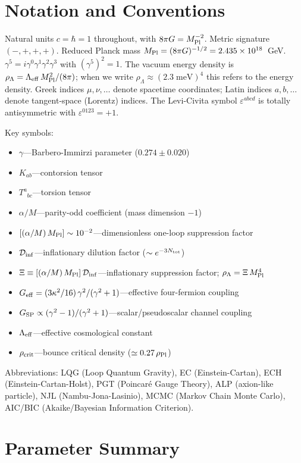 \documentclass[aps,prd,twocolumn,superscriptaddress,showpacs,preprintnumbers,
  nofootinbib,longbibliography,floatfix]{revtex4-2}
\newcommand{\Leff}{\Lambda_{\rm eff}}
\newcommand{\Dinf}{\mathcal{D}_{\rm inf}}
\newcommand{\rhocrit}{\rho_{\rm crit}}
\newcommand{\rhoPl}{\rho_{\rm Pl}}
\newcommand{\MPl}{M_{\rm Pl}}
\newcommand{\BI}{\gamma}
\newcommand{\Geff}{G_{\rm eff}}
\newcommand{\Gsp}{G_{\rm SP}}
\begin{document}
\section{Notation and Conventions}\label{app:notation}

Natural units $c=\hbar=1$ throughout, with $8\pi G = \MPl^{-2}$.
Metric signature $(-,+,+,+)$. Reduced Planck mass
$\MPl = (8\pi G)^{-1/2} = 2.435 \times 10^{18}$~GeV.
$\gamma^5 = i\gamma^0\gamma^1\gamma^2\gamma^3$ with
$(\gamma^5)^2 = 1$. The vacuum energy density is
$\rho_\Lambda = \Leff\,\MPl^2/(8\pi)$; when we write
$\rho_\Lambda \approx (2.3\;\text{meV})^4$ this refers to the energy
density. Greek indices $\mu,\nu,\ldots$ denote spacetime coordinates;
Latin indices $a,b,\ldots$ denote tangent-space (Lorentz) indices.
The Levi-Civita symbol $\varepsilon^{abcd}$ is totally antisymmetric
with $\varepsilon^{0123}=+1$.

Key symbols:
\begin{itemize}[leftmargin=*]
\item $\BI$---Barbero-Immirzi parameter ($0.274 \pm 0.020$)
\item $K_{ab}$---contorsion tensor
\item $T^a_{\;\;bc}$---torsion tensor
\item $\alpha/M$---parity-odd coefficient (mass dimension $-1$)
\item $[(\alpha/M)\,\MPl]\sim 10^{-2}$---dimensionless one-loop
  suppression factor
\item $\Dinf$---inflationary dilution factor ($\sim e^{-3N_{\rm tot}}$)
\item $\Xi\equiv[(\alpha/M)\,\MPl]\,\Dinf$---inflationary suppression
  factor; $\rho_\Lambda = \Xi\,\MPl^4$
\item $\Geff = (3\kappa^2/16)\,\BI^2/(\BI^2+1)$---effective four-fermion
  coupling
\item $\Gsp \propto (\BI^2-1)/(\BI^2+1)$---scalar/pseudoscalar channel
  coupling
\item $\Leff$---effective cosmological constant
\item $\rhocrit$---bounce critical density ($\simeq 0.27\,\rhoPl$)
\end{itemize}

Abbreviations: LQG (Loop Quantum Gravity), EC (Einstein-Cartan),
ECH (Einstein-Cartan-Holst), PGT (Poincar\'e Gauge Theory),
ALP (axion-like particle), NJL (Nambu-Jona-Lasinio),
MCMC (Markov Chain Monte Carlo), AIC/BIC (Akaike/Bayesian Information
Criterion).


\section{Parameter Summary}\label{app:params}
\end{document}
